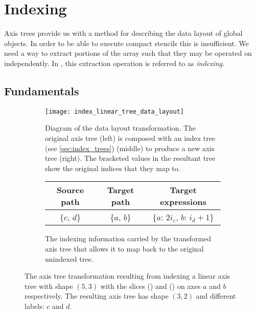 \documentclass[thesis]{subfiles}
\begin{document}

\chapter{Indexing}

Axis trees provide us with a method for describing the data layout of global objects.
In order to be able to execute compact stencils this is insufficient.
We need a way to extract portions of the array such that they may be operated on independently.
In , this extraction operation is referred to as \textit{indexing}.

\section{Fundamentals}

\begin{figure}[h]
  \centering
  \begin{subfigure}{\textwidth}
    \centering
    \texttt{[image: index\_linear\_tree\_data\_layout]}
    \caption{
      Diagram of the data layout transformation.
      The original axis tree (left) is composed with an index tree (see \cref{sec:index_trees}) (middle) to produce a new axis tree (right).
      The bracketed values in the resultant tree show the original indices that they map to.
    }
    \label{fig:index_linear_tree_data_layout}
  \end{subfigure}

  \vspace{1em}

  \begin{subfigure}{\textwidth}
    \centering
    \begin{tabular}{|c|c|c|}
      \hline
      \textbf{Source path} & \textbf{Target path} & \textbf{Target expressions} \\
      \hline
      \{$c$, $d$\} & \{$a$, $b$\} & \{$a$: $2 i_c$, $b$: $i_d+1$\} \\
      \hline
    \end{tabular}
    \caption{
      The indexing information carried by the transformed axis tree that allows it to map back to the original unindexed tree.
    }
    \label{fig:index_linear_tree_exprs}
  \end{subfigure}

  \caption{
    The axis tree transformation resulting from indexing a linear axis tree with shape $(5, 3)$ with the slices () and () on axes $a$ and $b$ respectively.
    The resulting axis tree has shape $(3, 2)$ and different labels: $c$ and $d$.
  }
  \label{fig:index_linear_tree_all}
\end{figure}
\end{document}
